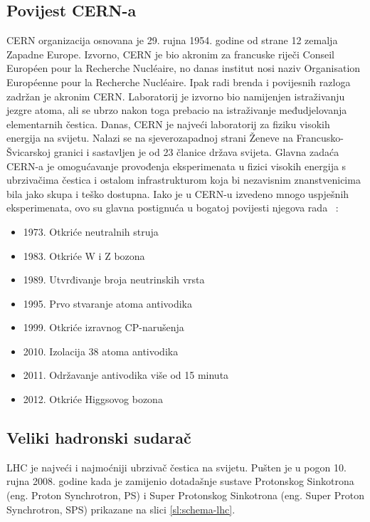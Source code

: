 \documentclass[12pt,a4paper,oneside]{article}
\begin{document}
\begin{linenumbers}
		\subsection{Povijest CERN-a}
		CERN organizacija  osnovana je 29. rujna 1954. godine od strane 12 zemalja Zapadne Europe. Izvorno, CERN je bio akronim za francuske riječi Conseil Européen pour la Recherche Nucléaire, no danas institut nosi naziv Organisation Européenne pour la Recherche Nucléaire. Ipak radi brenda i povijesnih razloga zadržan je akronim CERN. Laboratorij je izvorno bio namijenjen istraživanju jezgre atoma, ali se ubrzo nakon toga prebacio na istraživanje međudjelovanja elementarnih čestica. Danas, CERN je najveći laboratorij za fiziku visokih energija na svijetu. Nalazi se na sjeverozapadnoj strani Ženeve na Francusko-Švicarskoj granici i sastavljen je od 23 članice država svijeta. 
		Glavna zadaća CERN-a je omogućavanje provođenja eksperimenata u fizici visokih energija s ubrzivačima čestica i ostalom infrastrukturom koja bi nezavisnim znanstvenicima bila jako skupa i teško dostupna.  Iako je u CERN-u izvedeno  mnogo uspješnih eksperimenata, ovo su glavna postignuća u bogatoj povijesti njegova rada ~\cite{cern-wiki}:
		\begin{itemize}
		\item 1973. Otkriće neutralnih struja
		\item 1983. Otkriće W i Z bozona
		\item 1989. Utvrđivanje broja neutrinskih vrsta
		\item 1995. Prvo stvaranje atoma antivodika
		\item 1999. Otkriće izravnog CP-narušenja
		\item 2010. Izolacija 38 atoma antivodika
		\item 2011. Održavanje antivodika više od 15 minuta
		\item 2012. Otkriće Higgsovog bozona 
		\end{itemize}
		
		\subsection{Veliki hadronski sudarač}
		LHC je najveći i najmoćniji ubrzivač čestica na svijetu. Pušten je u pogon 10. rujna 2008. godine kada je zamijenio dotadašnje sustave Protonskog Sinkotrona (eng. Proton Synchrotron, PS) i Super Protonskog Sinkotrona (eng. Super Proton Synchrotron, SPS) prikazane na slici \ref{sl:schema-lhc}.
		

\end{linenumbers}
\end{document}
